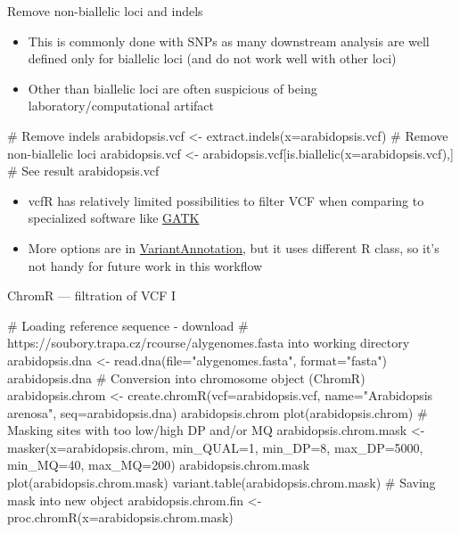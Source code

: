 \documentclass[compress, xelatex, 11pt, xcolor=svgnames, aspectratio=169,
	hyperref={
		bookmarks=true,
		unicode=true,
		colorlinks=true,
		pdftitle={Molecular data in R},
		plainpages=false,
		pdfauthor={Vojtech Zeisek},
		pdfsubject={Course about phylogeny and evolution in R},
		pdfcreator={XeLaTeX},
		pdfkeywords={R, evolution, phylogeny, molecular data},
		linkcolor=Crimson, %
		anchorcolor=Magenta, %
		citecolor=Magenta, %
		filecolor=Magenta, %
		menucolor=Magenta, %
		urlcolor=DodgerBlue, %
		},
	url={hyphens, lowtilde} %
	]{beamer}
\begin{document}
\begin{frame}[fragile]{Remove non-biallelic loci and indels}
	\begin{itemize}
		\item This is commonly done with SNPs as many downstream analysis are well defined only for biallelic loci (and do not work well with other loci)
		\item Other than biallelic loci are often suspicious of being laboratory/computational artifact
	\end{itemize}
	\begin{spluscode}
    # Remove indels
    arabidopsis.vcf <- extract.indels(x=arabidopsis.vcf)
    # Remove non-biallelic loci
    arabidopsis.vcf <- arabidopsis.vcf[is.biallelic(x=arabidopsis.vcf),]
    # See result
    arabidopsis.vcf
	\end{spluscode}
	\begin{itemize}
		\item vcfR has relatively limited possibilities to filter VCF when comparing to specialized software like \href{https://gatk.broadinstitute.org/}{GATK}
		\item More options are in \href{https://bioconductor.org/packages/release/bioc/html/VariantAnnotation.html}{VariantAnnotation}, but it uses different R class, so it's not handy for future work in this workflow
	\end{itemize}
\end{frame}

\begin{frame}[fragile]{ChromR --- filtration of VCF I}
	\begin{spluscode}
    # Loading reference sequence - download
    # https://soubory.trapa.cz/rcourse/alygenomes.fasta into working directory
    arabidopsis.dna <- read.dna(file="alygenomes.fasta", format="fasta")
    arabidopsis.dna
    # Conversion into chromosome object (ChromR)
    arabidopsis.chrom <- create.chromR(vcf=arabidopsis.vcf,
      name="Arabidopsis arenosa", seq=arabidopsis.dna)
    arabidopsis.chrom
    plot(arabidopsis.chrom)
    # Masking sites with too low/high DP and/or MQ
    arabidopsis.chrom.mask <- masker(x=arabidopsis.chrom, min_QUAL=1,
      min_DP=8, max_DP=5000, min_MQ=40, max_MQ=200)
    arabidopsis.chrom.mask
    plot(arabidopsis.chrom.mask)
    variant.table(arabidopsis.chrom.mask)
    # Saving mask into new object
    arabidopsis.chrom.fin <- proc.chromR(x=arabidopsis.chrom.mask)
	\end{spluscode}
\end{frame}
\end{document}
